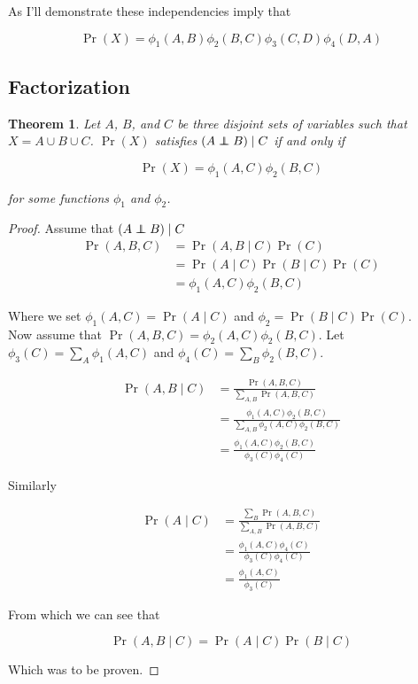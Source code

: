 \documentclass{article}
\newcommand\independent{\protect\mathpalette{\protect\independenT}{\perp}}
\def\independenT#1#2{\mathrel{\rlap{$#1#2$}\mkern2mu{#1#2}}}
\newtheorem{theorem}{Theorem}
\begin{document}
As I'll demonstrate these independencies imply that

\begin{equation}
\Pr(X) = \phi_1(A,B)\phi_2(B,C)\phi_3(C,D)\phi_4(D,A) 
\end{equation}


\subsection*{Factorization}

\begin{theorem}
Let $A$, $B$, and $C$ be three disjoint sets of variables such that
$X = A \cup B \cup C$. $\Pr(X)$ satisfies $(A\independent B) \mid C$
if and only if


\begin{equation}
\Pr(X) = \phi_1(A,C)\phi_2(B,C)
\end{equation}

for some functions $\phi_1$ and $\phi_2$.
\end{theorem}

\begin{proof}
Assume that $(A\independent B) \mid C$
\begin{align}
\Pr(A,B,C) &= \Pr(A,B \mid C)\Pr(C) \\
&= \Pr(A \mid C)\Pr(B \mid C)\Pr(C) \\
&= \phi_1(A,C)\phi_2(B,C)
\end{align}

Where we set $\phi_1(A,C) = \Pr(A \mid C)$ and $\phi_2 = \Pr(B \mid
C)\Pr(C)$. \\

Now assume that $\Pr(A,B,C) = \phi_2(A,C)\phi_2(B,C)$. Let
$\phi_3(C)=\sum_A\phi_1(A,C)$ and $\phi_4(C)=\sum_B\phi_2(B,C)$.

\begin{align}
\Pr(A,B \mid C) &= \frac{\Pr(A,B,C)}{\sum_{A,B}\Pr(A,B,C)} \\
&= \frac{\phi_1(A,C)\phi_2(B,C)}{\sum_{A,B}\phi_2(A,C)\phi_2(B,C)} \\
&= \frac{\phi_1(A,C)\phi_2(B,C)}{\phi_3(C)\phi_4(C)}
\end{align}

Similarly

\begin{align}
\Pr(A \mid C) &= \frac{\sum_B\Pr(A,B,C)}{\sum_{A,B}\Pr(A,B,C)} \\
&= \frac{\phi_1(A,C)\phi_4(C)}{\phi_3(C)\phi_4(C)} \\
&= \frac{\phi_1(A,C)}{\phi_3(C)}
\end{align}

From which we can see that 

\begin{equation}
\Pr(A,B \mid C) = \Pr(A \mid C)\Pr(B \mid C)
\end{equation}

Which was to be proven.
\end{proof}
\end{document}
